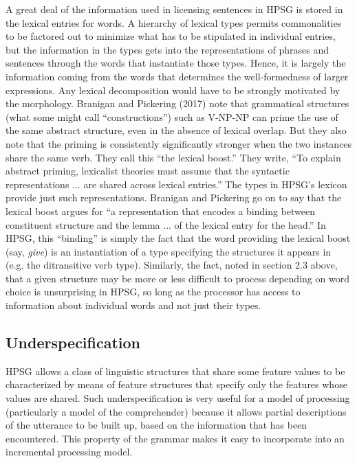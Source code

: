 \documentclass[a4paper]{article}
\begin{document}
A great deal of the information used in licensing sentences in HPSG is stored in the lexical entries for words.  A hierarchy of lexical types permits commonalities to be factored out to minimize what has to be stipulated in individual entries, but the information in the types gets into the representations of phrases and sentences through the words that instantiate those types. Hence, it is largely the information coming from the words that determines the well-formedness of larger expressions.  Any lexical decomposition would have to be strongly motivated by the morphology.
\newline
\newline
Branigan and Pickering (2017) note that grammatical structures (what some might call ``constructions'') such as V-NP-NP can prime the use of the same abstract structure, even in the absence of lexical overlap.  But they also note that the priming is consistently significantly stronger when the two instances share the same verb.  They call this ``the lexical boost.''  They write, ``To explain abstract
priming, lexicalist theories must assume that the syntactic
representations ...
are shared across lexical entries.'' The types in HPSG's lexicon provide just such representations.  Branigan and Pickering go on to say that the lexical boost argues for ``a representation that
encodes a binding between constituent structure and the
lemma ... of the lexical entry for the
head.''  In HPSG, this ``binding'' is simply the fact that the word providing the lexical boost (say, {\it give}) is an instantiation of a type specifying the structures it appears in (e.g. the ditransitive verb type).
\newline
\newline
Similarly, the fact, noted in section 2.3 above, that a given structure may be more or less difficult to process depending on word choice is unsurprising in HPSG, so long as the processor has access to information about individual words and not just their types.   
\subsection{Underspecification}

HPSG allows a class of linguistic structures that share some feature values to be characterized by means of feature structures that specify only the features whose values are shared.  Such underspecification is very useful for a model of processing (particularly a model of the comprehender) because it allows partial descriptions of the utterance to be built up, based on the information that has been encountered.  This property of the grammar makes it easy to incorporate into an incremental processing model.
\end{document}
